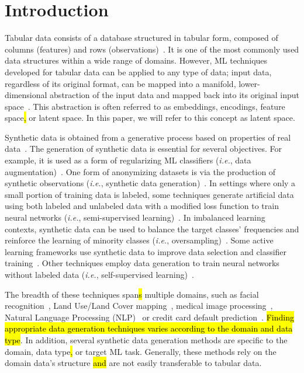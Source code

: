\section{Introduction}\label{sec:introduction}


Tabular data consists of a database structured in tabular form, composed of
columns (features) and rows (observations)~\cite{yoon2020vime}. It is one of
the most commonly used data structures within a wide range of domains.
However, ML techniques developed for tabular data can be applied to any type
of data; input data, regardless of its original format, can be mapped into a
manifold, lower-dimensional abstraction of the input data and mapped back into
its original input space~\cite{kingma2019introduction, devries2017dataset}.
This abstraction is often referred to as embeddings, encodings, feature
space\hl{,} or latent space. In this paper, we will refer to this concept as
latent space.

Synthetic data is obtained from a generative process based on properties of
real data~\cite{assefa2020generating}. The generation of synthetic data is
essential for several objectives. For example, it is used as a form of
regularizing ML classifiers (\textit{i.e.}, data
augmentation)~\cite{wang2021regularizing}. One form of anonymizing datasets is
via the production of synthetic observations (\textit{i.e.}, synthetic data
generation)~\cite{patki2016synthetic}. In settings where only a small portion
of training data is labeled, some techniques generate artificial data using
both labeled and unlabeled data with a modified loss function to train neural
networks (\textit{i.e.}, semi-supervised learning)~\cite{laine2017temporal}.
In imbalanced learning contexts, synthetic data can be used to balance the
target classes' frequencies and reinforce the learning of minority classes
(\textit{i.e.}, oversampling)~\cite{fonseca2021improving}. Some active
learning frameworks use synthetic data to improve data selection and
classifier training~\cite{kim2021lada}. Other techniques employ data
generation to train neural networks without labeled data (\textit{i.e.},
self-supervised learning)~\cite{grill2020bootstrap}.

The breadth of these techniques span\hl{s} multiple domains, such as facial
recognition~\cite{lv2017data}, Land Use/Land Cover
mapping~\cite{douzas2019imbalanced}, medical image
processing~\cite{yi2019generative}, Natural Language Processing
(NLP)~\cite{feng2021survey} or credit card default
prediction~\cite{alam2020investigation}. \hl{Finding appropriate data
generation techniques varies according to the domain and data type}. In
addition, several synthetic data generation methods are specific to the
domain, data type\hl{,} or target ML task. Generally, these methods rely on
the domain data's structure \hl{and} are not easily transferable to tabular
data.

